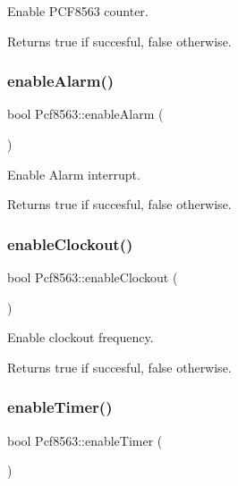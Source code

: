 Enable P\+C\+F8563 counter. 

\begin{DoxyReturn}{Returns}
true if succesful, false otherwise. 
\end{DoxyReturn}
\mbox{\label{namespacePcf8563_a6e196fe410c080e4f6e20aadbe279637}} 
\subsubsection{\texorpdfstring{enable\+Alarm()}{enableAlarm()}}
{\footnotesize\ttfamily bool Pcf8563\+::enable\+Alarm (\begin{DoxyParamCaption}{ }\end{DoxyParamCaption})}



Enable Alarm interrupt. 

\begin{DoxyReturn}{Returns}
true if succesful, false otherwise. 
\end{DoxyReturn}
\mbox{\label{namespacePcf8563_a03e4ea0f00fd48664537788ba491fa60}} 
\subsubsection{\texorpdfstring{enable\+Clockout()}{enableClockout()}}
{\footnotesize\ttfamily bool Pcf8563\+::enable\+Clockout (\begin{DoxyParamCaption}{ }\end{DoxyParamCaption})}



Enable clockout frequency. 

\begin{DoxyReturn}{Returns}
true if succesful, false otherwise. 
\end{DoxyReturn}
\mbox{\label{namespacePcf8563_af4cc94d1ea73bbff5d44e1b716111cdb}} 
\subsubsection{\texorpdfstring{enable\+Timer()}{enableTimer()}}
{\footnotesize\ttfamily bool Pcf8563\+::enable\+Timer (\begin{DoxyParamCaption}{ }\end{DoxyParamCaption})}



